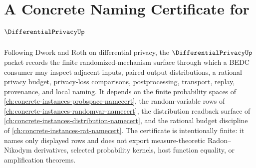\chapter{A Concrete Naming Certificate for $\DifferentialPrivacyUp$}
\label{ch:concrete-instances-differential-privacy-namecert}

Following Dwork and Roth on differential privacy, the $\DifferentialPrivacyUp$ packet records the finite randomized-mechanism surface through which a BEDC consumer may inspect adjacent inputs, paired output distributions, a rational privacy budget, privacy-loss comparisons, postprocessing, transport, replay, provenance, and local naming. It depends on the finite probability spaces of \autoref{ch:concrete-instances-probspace-namecert}, the random-variable rows of \autoref{ch:concrete-instances-randomvar-namecert}, the distribution readback surface of \autoref{ch:concrete-instances-distribution-namecert}, and the rational budget discipline of \autoref{ch:concrete-instances-rat-namecert}. The certificate is intentionally finite: it names only displayed rows and does not export measure-theoretic Radon--Nikodym derivatives, selected probability kernels, host function equality, or amplification theorems.

